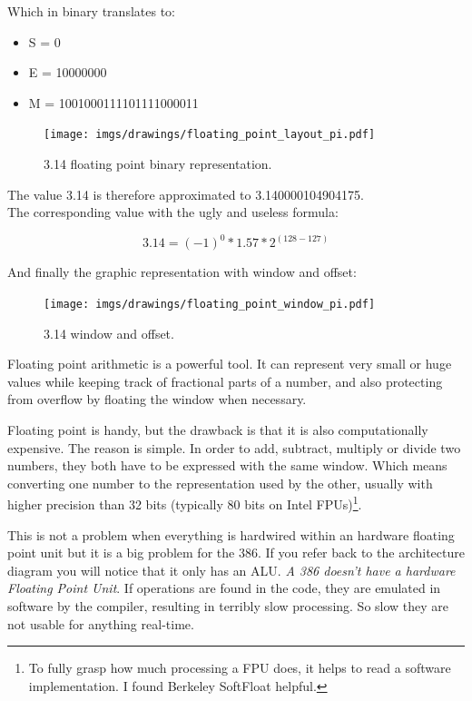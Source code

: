 \documentclass[book.tex]{subfiles}
\begin{document}
Which in binary translates to:

\begin{itemize}
\item S = 0
\item E = 10000000
\item M = 1001000111101111000011
\end{itemize}

\begin{figure}[H]
\centering
\texttt{[image: imgs/drawings/floating\_point\_layout\_pi.pdf]}
\caption{3.14 floating point binary representation.}
\label{fig:fp_internals}
\end{figure}
  \bigskip

The value 3.14 is therefore approximated to 3.140000104904175.\\

The corresponding value with the ugly and useless formula:

\begin{equation}
3.14 = (-1)^0 * 1.57 * 2^{(128-127)}
\end{equation}

\bigskip

And finally the graphic representation with window and offset:\\

\begin{figure}[H]
\centering
\texttt{[image: imgs/drawings/floating\_point\_window\_pi.pdf]}

\caption{3.14 window and offset.}
\label{fig:fp_internals}
\end{figure}
  \bigskip

Floating point arithmetic is a powerful tool. It can represent very small or huge values while keeping track of fractional parts of a number, and also protecting from overflow by floating the window when necessary.\\
\par
Floating point is handy, but the drawback is that it is also computationally expensive. The reason is simple. In order to add, subtract, multiply or divide two numbers, they both have to be expressed with the same window. Which means converting one number to the representation used by the other, usually with higher precision than 32 bits (typically 80 bits on Intel FPUs)\footnote{To fully grasp how much processing a FPU does, it helps to read a software implementation. I found Berkeley SoftFloat helpful.}.\\
\par
This is not a problem when everything is hardwired within an hardware floating point unit but it is a big problem for the 386. If you refer back to the architecture diagram you will notice that it only has an ALU. \emph{A 386 doesn't have a hardware Floating Point Unit}. If  operations are found in the code, they are emulated in software by the compiler, resulting in terribly slow processing. So slow they are not usable for anything real-time.\\ 
\par
\end{document}
